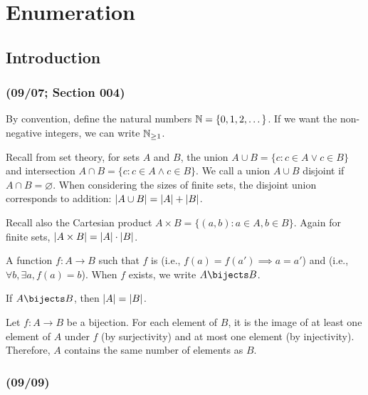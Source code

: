 \part{Enumeration}

\chapter{Introduction}

\section{(09/07; Section 004)}

By convention, define the natural numbers $\mathbb{N} = \{0,1,2,\dotsc\}$.
If we want the non-negative integers, we can write $\mathbb{N}_{\geq1}$.

Recall from set theory, for sets $A$ and $B$,
the union $A \cup B = \{c : c \in A \lor c \in B\}$
and intersection $A \cap B = \{c : c \in A \land c \in B\}$.
We call a union $A \cup B$ disjoint if $A \cap B = \varnothing$.
When considering the sizes of finite sets,
the disjoint union corresponds to addition:
$\abs{A \cup B} = \abs{A} + \abs{B}$.

Recall also the Cartesian product $A \times B = \{(a,b) : a \in A, b \in B\}$.
Again for finite sets, $\abs{A \times B} = \abs{A} \cdot \abs{B}$.

\begin{defn}[bijection][bijectivity]
  A function $f : A \to B$ such that $f$ is
   (i.e., $f(a) = f(a') \implies a = a'$)
  and  (i.e., $\forall b, \exists a, f(a) = b$).
  When $f$ exists, we write $A \bijects B$.
\end{defn}

\begin{theorem}
  If $A \bijects B$, then $\abs{A} = \abs{B}$.
\end{theorem}
\begin{prf}
  Let $f : A \to B$ be a bijection.
  For each element of $B$, it is the image of
  at least one element of $A$ under $f$ (by surjectivity)
  and at most one element (by injectivity).
  Therefore, $A$ contains the same number of elements as $B$.
\end{prf}

\section{(09/09)}

